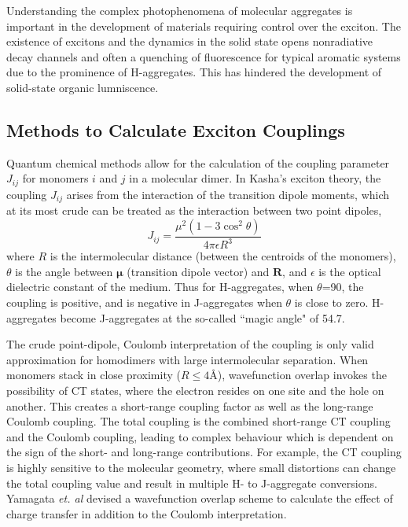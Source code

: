 Understanding the complex photophenomena of molecular aggregates is important in the development of materials requiring control over the exciton. The existence of excitons and the dynamics in the solid state opens nonradiative decay channels and often a quenching of fluorescence for typical aromatic systems due to the prominence of H-aggregates. This has hindered the development of solid-state organic lumniscence. 

\subsection{Methods to Calculate Exciton Couplings}\label{section: lom exciton_couplings}
Quantum chemical methods allow for the calculation of the coupling parameter $J_{ij}$ for monomers $i$ and $j$ in a molecular dimer. In Kasha's exciton theory, the coupling $J_{ij}$ arises from the interaction of the transition dipole moments, which at its most crude can be treated as the interaction between two point dipoles,
\begin{equation}\label{equation: PDA}
    J_{ij}=\frac{\mu^{2}(1-3\cos^{2}\theta)}{4\pi\epsilon{}R^3}
\end{equation}
where $R$ is the intermolecular distance (between the centroids of the monomers), $\theta$ is the angle between  $\bm{\mu}$ (transition dipole vector) and $\bm{R}$, and $\epsilon$ is the optical dielectric constant of the medium. Thus for H-aggregates, when $\theta$=90\degree{}, the coupling is positive, and is negative in J-aggregates when $\theta$ is close to zero. H-aggregates become J-aggregates at the so-called ``magic angle" of 54.7\textdegree.\cite{Hestand2018}

The crude point-dipole, Coulomb interpretation of the coupling is only valid approximation for homodimers with large intermolecular separation.\cite{Kistler2013} When monomers stack in close proximity ($R\leq4\si{\angstrom}$), wavefunction overlap invokes the possibility of \ac{CT} states, where the electron resides on one site and the hole on another.\cite{Darghouth2018} This creates a short-range coupling factor as well as the long-range Coulomb coupling. The total coupling is the combined short-range \ac{CT} coupling and the Coulomb coupling, leading to complex behaviour which is dependent on the sign of the short- and long-range contributions. For example, the \ac{CT} coupling is highly sensitive to the molecular geometry, where small distortions can change the total coupling value and result in multiple H- to J-aggregate conversions.\cite{Arago2015} Yamagata \textit{et. al} devised a wavefunction overlap scheme to calculate the effect of charge transfer in addition to  the Coulomb interpretation.\cite{Yamagata2012} %

